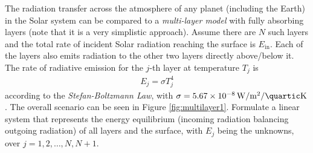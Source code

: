\begin{exmp}
\label{exmp:multilayer1}
The radiation transfer across the atmosphere of any planet (including the Earth) in the Solar system can be compared to a \textit{multi-layer model} with fully absorbing layers (note that it is a very simplistic approach). Assume there are $N$ such layers and the total rate of incident Solar radiation reaching the surface is $E_{\text{in}}$. Each of the layers also emits radiation to the other two layers directly above/below it. The rate of radiative emission for the $j$-th layer at temperature $T_j$ is
\begin{align}
E_j = \sigma T_j^4    
\end{align}
according to the \textit{Stefan-Boltzmann Law}, with $\sigma = \SI{5.67e-8}{\W \per \square\m \per \quartic\K}$. The overall scenario can be seen in Figure \ref{fig:multilayer1}. Formulate a linear system that represents the energy equilibrium (incoming radiation balancing outgoing radiation) of all layers and the surface, with $E_j$ being the unknowns, over $j = 1, 2, \ldots, N, N+1$.
\end{exmp}
